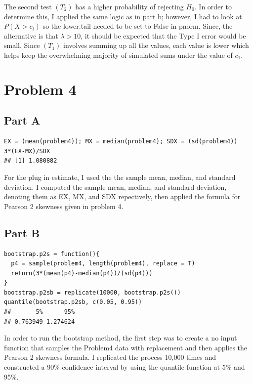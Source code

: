 \documentclass{article}\usepackage[]{graphicx}\usepackage[]{color}
\makeatletter
\newenvironment{kframe}{%
 \def\at@end@of@kframe{}%
 \ifinner\ifhmode%
  \def\at@end@of@kframe{\end{minipage}}%
  \begin{minipage}{\columnwidth}%
 \fi\fi%
 \def\FrameCommand##1{\hskip\@totalleftmargin \hskip-\fboxsep
 \colorbox{shadecolor}{##1}\hskip-\fboxsep
     \hskip-\linewidth \hskip-\@totalleftmargin \hskip\columnwidth}%
 \MakeFramed {\advance\hsize-\width
   \@totalleftmargin\z@ \linewidth\hsize
   \@setminipage}}%
 {\par\unskip\endMakeFramed%
 \at@end@of@kframe}
\newenvironment{knitrout}{}{} %
\makeatother
\begin{document}
The second test $(T_2)$ has a higher probability of rejecting $H_{0}$. In order to determine this, I applied the same logic as in part b; however, I had to look at $P(X>c_{i})$ so the lower.tail needed to be set to False in pnorm. Since, the alternative is that $\lambda>10$, it should be expected that the Type I error would be small. Since $(T_{1})$ involves summing up all the values, each value is lower which helps keep the overwhelming majority of simulated sums under the value of $c_1$. 
\section*{Problem 4}
\subsection*{Part A}
\begin{knitrout}
\color{fgcolor}\begin{kframe}
\begin{verbatim}
EX = (mean(problem4)); MX = median(problem4); SDX = (sd(problem4))
3*(EX-MX)/SDX
## [1] 1.080882
\end{verbatim}
\end{kframe}
\end{knitrout}
For the plug in estimate, I used the the sample mean, median, and standard deviation. I computed the sample mean, median, and standard deviation, denoting them as EX, MX, and SDX repectively, then applied the formula for Pearson 2 skewness given in problem 4.
\subsection*{Part B}
\begin{knitrout}
\color{fgcolor}\begin{kframe}
\begin{verbatim}
bootstrap.p2s = function(){
  p4 = sample(problem4, length(problem4), replace = T)
  return(3*(mean(p4)-median(p4))/(sd(p4)))
}
bootstrap.p2sb = replicate(10000, bootstrap.p2s())
quantile(bootstrap.p2sb, c(0.05, 0.95))
##       5%      95% 
## 0.763949 1.274624
\end{verbatim}
\end{kframe}
\end{knitrout}
In order to run the bootstrap method, the first step was to create a no input function that samples the Problem4 data with replacement and then applies the Pearson 2 skewness formula. I replicated the process 10,000 times and constructed a 90\% confidence interval by using the quantile function at 5\% and 95\%.
\end{document}
